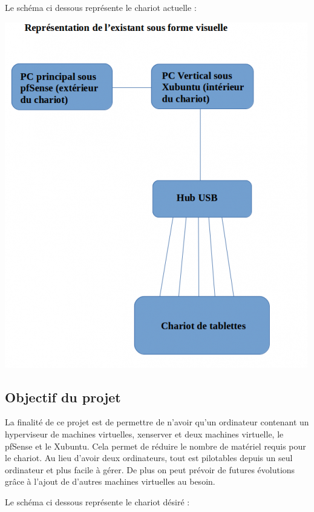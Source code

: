 \documentclass[a4paper,12pt]{extarticle}
\begin{document}
Le schéma ci dessous représente le chariot actuelle :\\

\begin{center}
\includegraphics[scale=0.90]{representation_existant}
\end{center}

\clearpage
\subsection{Objectif du projet}

La finalité de ce projet est de permettre de n’avoir qu’un ordinateur contenant un hyperviseur de machines virtuelles, xenserver et deux machines virtuelle, le pfSense et le Xubuntu.
Cela permet de réduire le nombre de matériel requis pour le chariot. Au lieu d’avoir deux ordinateurs, tout est pilotables depuis un seul ordinateur et plus facile à gérer. De plus on peut prévoir de futures évolutions grâce à l’ajout de d’autres machines virtuelles au besoin.

Le schéma ci dessous représente le chariot désiré :\\
\end{document}
